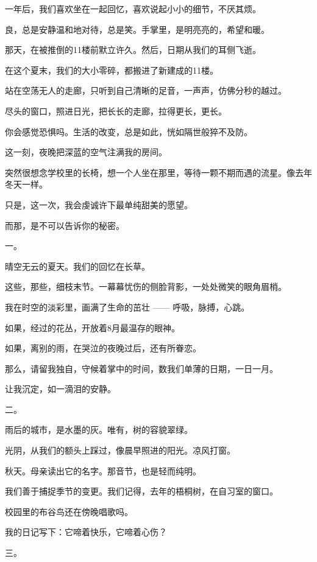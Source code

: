 \documentclass[12pt,a4paper]{article}
\newcommand{\subpart}[1]{
	\begingroup \par
	\vspace{1ex} \centering #1
	\par \endgroup \nopagebreak[4]
}
\begin{document}
		一年后，我们喜欢坐在一起回忆，喜欢说起小小的细节，不厌其烦。\par
		良，总是安静温和地对待，总是笑。手掌里，是明亮亮的，希望和暖。

		那天，在被推倒的11楼前默立许久。然后，日期从我们的耳侧飞逝。\par
		在这个夏末，我们的大小零碎，都搬进了新建成的11楼。\par
		站在空荡无人的走廊，只听到自己清晰的足音，一声声，仿佛分秒的越过。\par
		尽头的窗口，照进日光，把长长的走廊，拉得更长，更长。\par
		你会感觉恐惧吗。生活的改变，总是如此，恍如隔世般猝不及防。

		这一刻，夜晚把深蓝的空气注满我的房间。\par
		突然很想念学校里的长椅，想一个人坐在那里，等待一颗不期而遇的流星。像去年冬天一样。\par
		只是，这一次，我会虔诚许下最单纯甜美的愿望。

		而那，是不可以告诉你的秘密。

	\endwriting



		\subpart{一。}

		晴空无云的夏天。我们的回忆在长草。\par
		这些，那些，细枝末节。一幕幕忧伤的侧脸背影，一处处微笑的眼角眉梢。\par
		我在时空的淡彩里，画满了生命的茁壮 —— 呼吸，脉搏，心跳。\par
		如果，经过的花丛，开放着8月最温存的眼神。\par
		如果，离别的雨，在哭泣的夜晚过后，还有所眷恋。\par
		那么，请留我独自，守候着掌中的时间，数我们单薄的日期，一日一月。\par
		让我沉定，如一滴泪的安静。

		\subpart{二。}

		雨后的城市，是水墨的灰。唯有，树的容貌翠绿。\par
		光阴，从我们的额头上踩过，像晨早照进的阳光。凉风打窗。\par
		秋天。母亲读出它的名字。那音节，也是轻而纯明。\par
		我们善于捕捉季节的变更。我们记得，去年的梧桐树，在自习室的窗口。\par
		校园里的布谷鸟还在傍晚唱歌吗。\par
		我的日记写下：它啼着快乐，它啼着心伤？

		\subpart{三。}
\end{document}

